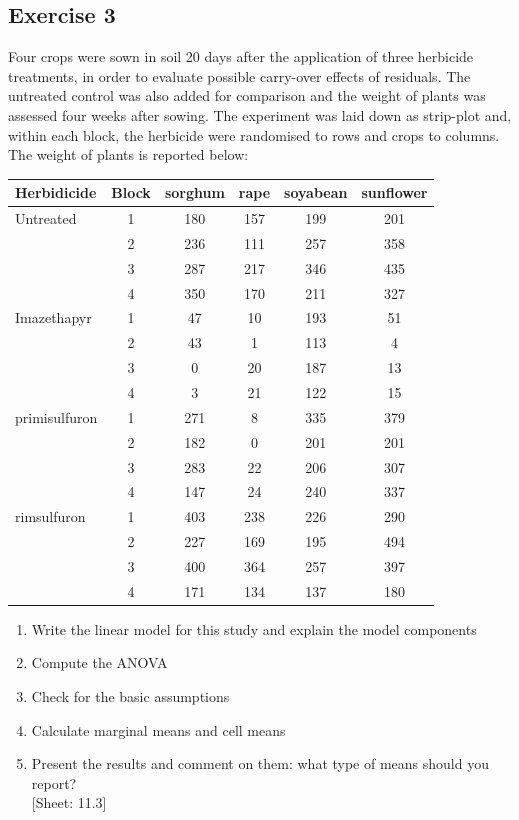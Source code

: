 \documentclass[a4paper,12pt,oneside]{book}
\providecommand{\tightlist}{%
  \setlength{\itemsep}{0pt}\setlength{\parskip}{0pt}}
\begin{document}
\hypertarget{exercise-3-7}{%
\subsection{Exercise 3}\label{exercise-3-7}}

Four crops were sown in soil 20 days after the application of three herbicide treatments, in order to evaluate possible carry-over effects of residuals. The untreated control was also added for comparison and the weight of plants was assessed four weeks after sowing. The experiment was laid down as strip-plot and, within each block, the herbicide were randomised to rows and crops to columns. The weight of plants is reported below:

\begin{longtable}[]{@{}lccccc@{}}
\toprule
Herbidicide & Block & sorghum & rape & soyabean & sunflower \\
\midrule
\endhead
Untreated & 1 & 180 & 157 & 199 & 201 \\
& 2 & 236 & 111 & 257 & 358 \\
& 3 & 287 & 217 & 346 & 435 \\
& 4 & 350 & 170 & 211 & 327 \\
Imazethapyr & 1 & 47 & 10 & 193 & 51 \\
& 2 & 43 & 1 & 113 & 4 \\
& 3 & 0 & 20 & 187 & 13 \\
& 4 & 3 & 21 & 122 & 15 \\
primisulfuron & 1 & 271 & 8 & 335 & 379 \\
& 2 & 182 & 0 & 201 & 201 \\
& 3 & 283 & 22 & 206 & 307 \\
& 4 & 147 & 24 & 240 & 337 \\
rimsulfuron & 1 & 403 & 238 & 226 & 290 \\
& 2 & 227 & 169 & 195 & 494 \\
& 3 & 400 & 364 & 257 & 397 \\
& 4 & 171 & 134 & 137 & 180 \\
\bottomrule
\end{longtable}

\begin{enumerate}
\def\labelenumi{\arabic{enumi}.}
\tightlist
\item
  Write the linear model for this study and explain the model components
\item
  Compute the ANOVA
\item
  Check for the basic assumptions
\item
  Calculate marginal means and cell means
\item
  Present the results and comment on them: what type of means should you report?\\
  {[}Sheet: 11.3{]}
\end{enumerate}
\end{document}
